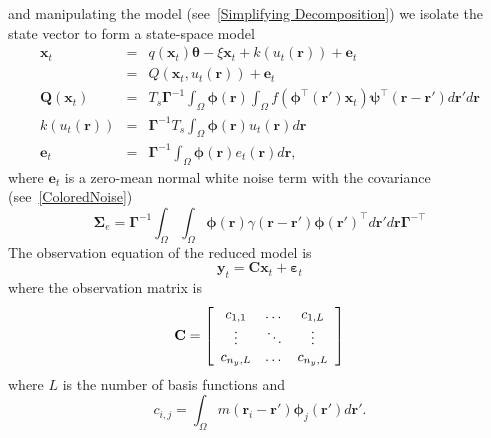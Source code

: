 \documentclass[12pt]{iopart}		%
\begin{document}
and manipulating the model (see~\ref{Simplifying Decomposition}) we isolate the state vector to form a state-space model
\begin{eqnarray}\label{Homogeneous SS Model}
	\mathbf{x}_t &=& q(\mathbf{x}_t)\boldsymbol{\theta} - \xi\mathbf{x}_t + k\left(u_t\left(\mathbf{r}\right)\right) + \mathbf{e}_t \\
	&=& Q\left(\mathbf{x}_t,u_t(\mathbf{r})\right) + \mathbf{e}_t \\
	\mathbf{Q}\left(\mathbf{x}_t\right) &=& T_s\boldsymbol{\Gamma}^{ - 1}\int_\Omega {\boldsymbol{\phi}\left(\mathbf{r}\right) \int_\Omega {f\left(\boldsymbol{\phi}^{\top}\left(\mathbf{r}'\right)\mathbf{x}_t\right)\boldsymbol{\psi}^{\top} \left(\mathbf{r}-\mathbf{r}'\right)d\mathbf{r}'} d\mathbf{r}} \\
	k(u_t(\mathbf{r})) &=& \boldsymbol{\Gamma}^{-1}T_s \int_\Omega{\boldsymbol{\phi} \left(\mathbf{r}\right) u_t\left(\mathbf{r}\right)d\mathbf{r}} \\
	\mathbf{e}_t &=& \boldsymbol{\Gamma}^{-1}\int_\Omega{\boldsymbol{\phi}\left(\mathbf{r}\right)e_t\left(\mathbf{r}\right)d\mathbf{r}},
\end{eqnarray}
where $\mathbf{e}_t$ is a zero-mean normal white noise term with the covariance (see~\ref{ColoredNoise})
\begin{equation} 
\boldsymbol{\Sigma}_e=\boldsymbol{\Gamma}^{-1}\int_{\Omega}\int_{\Omega}\boldsymbol{\phi}\left(\mathbf r\right) \gamma\left(\mathbf{r}- \mathbf{r}' \right)\boldsymbol{\phi}\left(\mathbf{r}'\right)^{\top}d\mathbf{r}' d\mathbf{r}\boldsymbol{\Gamma}^{- \top} 
\end{equation}
The observation equation of the reduced model is
\begin{equation}\label{ObservationEquation}
    \mathbf{y}_t = \mathbf{C}\mathbf{x}_t + \boldsymbol{\varepsilon}_t
\end{equation}
where the observation matrix is
\begin{equation}
	\mathbf{C} = \left[\begin{array}{{ccc}}
	c_{1,1} & \dots & c_{1,L} \\
	\vdots & \ddots & \vdots \\
	c_{n_y,L} & \dots & c_{n_y,L} \end{array}\right]
\end{equation}
where $L$ is the number of basis functions and
\begin{equation}
	c_{i,j} = \int_{\Omega}m(\mathbf{r}_i - \mathbf{r}')\boldsymbol{\phi}_j(\mathbf{r}')d\mathbf{r}'.
\end{equation}
\end{document}
